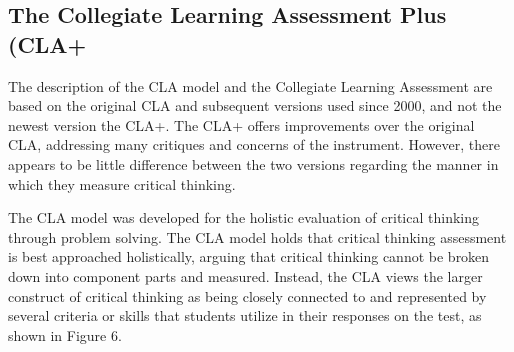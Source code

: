 \subsection{The Collegiate Learning Assessment Plus (CLA+}

The description of the CLA model and the Collegiate Learning Assessment are based on the original CLA and subsequent versions used since 2000, and not the newest version the CLA+.  The CLA+ offers improvements over the original CLA, addressing many critiques and concerns of the instrument.  However, there appears to be little difference between the two versions regarding the manner in which they measure critical thinking.

The CLA model was developed for the holistic evaluation of critical thinking through problem solving.  The CLA model holds that critical thinking assessment is best approached holistically, arguing that critical thinking cannot be broken down into component parts and measured. Instead, the CLA views the larger construct of critical thinking as being closely connected to and represented by several criteria or skills that students utilize in their responses on the test, as shown in Figure 6.
